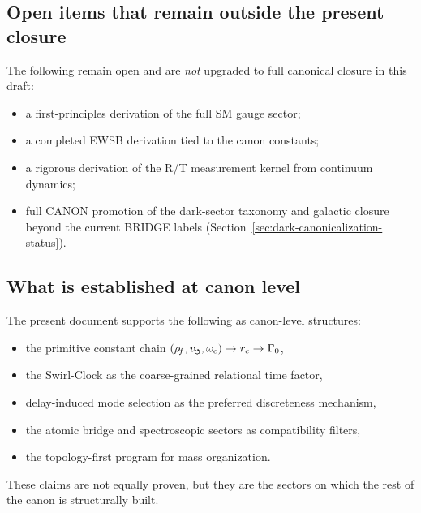 \documentclass[11pt]{article}
\theoremstyle{definition}
\theoremstyle{plain}
\theoremstyle{remark}
\newcommand{\swirlarrow}{\mathchoice{\mkern-2mu\scriptstyle\boldsymbol{\circlearrowleft}}{\mkern-2mu\scriptstyle\boldsymbol{\circlearrowleft}}{\mkern-2mu\scriptscriptstyle\boldsymbol{\circlearrowleft}}{\mkern-2mu\scriptscriptstyle\boldsymbol{\circlearrowleft}}}
\newcommand{\rhoF}{{\rho_{\!f}}}
\begin{document}
    \subsection{Open items that remain outside the present closure}

        The following remain open and are \emph{not} upgraded to full canonical closure in this draft:
        \begin{itemize}
            \item a first-principles derivation of the full SM gauge sector;
            \item a completed EWSB derivation tied to the canon constants;
            \item a rigorous derivation of the R/T measurement kernel from continuum dynamics;
            \item full CANON promotion of the dark-sector taxonomy and galactic closure beyond the current BRIDGE labels (Section~\ref{sec:dark-canonicalization-status}).
        \end{itemize}

    \subsection{What is established at canon level}
        The present document supports the following as canon-level structures:
        \begin{itemize}
            \item the primitive constant chain $(\rhoF, v_{\swirlarrow}, \omega_c) \to r_c \to \Gamma_0$,
            \item the Swirl-Clock as the coarse-grained relational time factor,
            \item delay-induced mode selection as the preferred discreteness mechanism,
            \item the atomic bridge and spectroscopic sectors as compatibility filters,
            \item the topology-first program for mass organization.
        \end{itemize}
        These claims are not equally proven, but they are the sectors on which the rest of the canon is structurally built.
\end{document}
